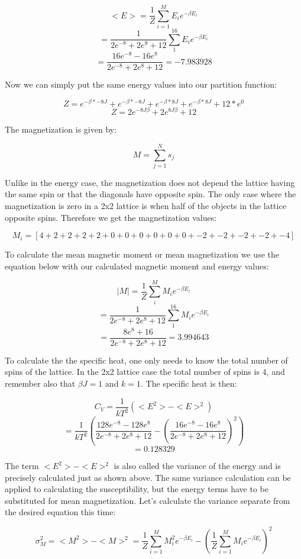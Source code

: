 \documentclass[10pt,a4paper]{article}
\begin{document}
$$
<E> = \frac{1}{Z}\sum^{M}_{i = 1} E_i e^{-\beta E_i}
$$
$$
 = \frac{1}{2e^{-8} + 2e^{8} + 12}\sum^{16}_{1} E_i e^{-\beta E_i}
$$
$$
 = \frac{16e^{-8}-16e^{8}}{2e^{-8} + 2e^{8} + 12} = -7.983928
$$

\noindent Now we can simply put the same energy values into our partition function:

$$
Z = e^{-\beta * -8J} + e^{-\beta * -8J} + e^{-\beta * 8J} + e^{-\beta * 8J} + 12*e^0
$$
$$
Z = 2e^{-8J\beta} + 2e^{8J\beta} + 12
$$

\noindent The magnetization is given by:

$$
M = \sum^{N}_{j = 1} s_j
$$

\noindent Unlike in the energy case, the magnetization does not depend the lattice having the same spin or that the diagonals have opposite spin. The only case where the magnetization is zero in a 2x2 lattice is when half of the objects in the lattice opposite spins. Therefore we get the magnetization values:

$$
M_i = [4 + 2 + 2 + 2 + 2 + 0 + 0 + 0 + 0 + 0 + 0 + -2 + -2 + -2 + -2 + -4]
$$

\noindent To calculate the mean magnetic moment or mean magnetization we use the equation below with our calculated magnetic moment and energy values:

$$
|M| = \frac{1}{Z}\sum^{M}_{i}M_ie^{-\beta E_i}
$$
$$
 = \frac{1}{2e^{-8} + 2e^8 + 12}\sum^{16}_{1}M_ie^{-\beta E_i}
$$
$$
 = \frac{8e^{8} + 16}{2e^{-8} + 2e^8 + 12} = 3.994643
$$



\noindent To calculate the the specific heat, one only needs to know the total number of spins of the lattice. In the 2x2 lattice case the total number of spins is 4, and remember also that $\beta J = 1$ and $k = 1$. The specific heat is then:

$$
C_V = \frac{1}{kT^2}(<E^2> - <E>^2)
$$
$$
 = \frac{1}{kT^2}(\frac{128e^{-8} - 128e^8}{2e^{-8} + 2e^8 + 12} - (\frac{16e^{-8} - 16e^8}{2e^{-8} + 2e^8 + 12})^2)
$$
$$
 = 0.128329
$$

\noindent The term $<E^2> - <E>^2$ is also called the variance of the energy and is precisely calculated just as shown above. The same variance calculation can be applied to calculating the susceptibility, but the energy terms have to be substituted for mean magnetization.
Let's calculate the variance separate from the desired equation this time:

$$
\sigma_M^2 = <M^2>-<M>^2 = \frac{1}{Z}\sum^{M}_{i = 1}M_i^2 e^{-\beta E_i} - (\frac{1}{Z}\sum^{M}_{i = 1}M_i e^{-\beta E_i})^2
$$
\end{document}
